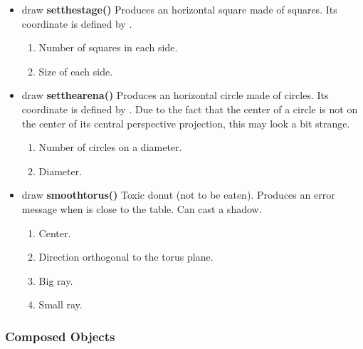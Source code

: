 \begin{itemize}
\item draw {\bfseries setthestage()} Produces an horizontal
square made of squares. Its  coordinate is defined by
.
\begin{enumerate}
\item {} Number of squares in each side.
\item {} Size of each side.
\end{enumerate}
\item draw {\bfseries setthearena()} Produces an horizontal
circle made of circles. Its  coordinate is defined by
. Due to the fact that the center of a
circle is not on the center of its central perspective
projection, this may look a bit strange.
\begin{enumerate}
\item {} Number of circles on a
diameter.
\item {} Diameter.
\end{enumerate}
\item draw {\bfseries smoothtorus()} Toxic donut (not to be
eaten). Produces an error message when  is
close to the table. Can cast a shadow.
\begin{enumerate}
\item {} Center.
\item {} Direction orthogonal to the
torus plane.
\item {} Big ray.
\item {} Small ray.
\end{enumerate}
\end{itemize}


\subsubsection{Composed Objects}

